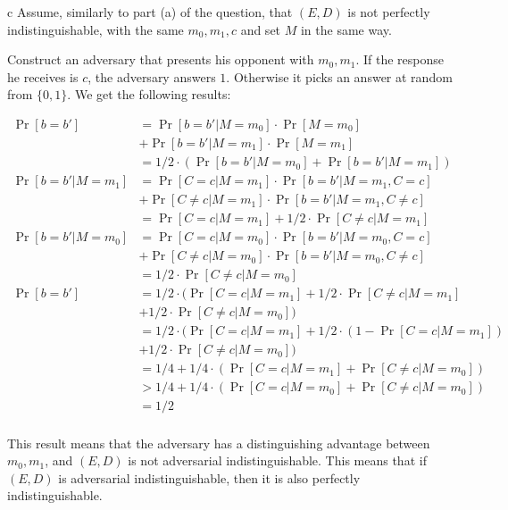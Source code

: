 \documentclass{article}
\begin{document}
\begin{paragraph}
	c Assume, similarly to part (a) of the question, that $(E,D)$ is not perfectly indistinguishable, with the same $m_0, m_1, c$ and set $M$ in the same way.

	Construct an adversary that presents his opponent with $m_0, m_1$. If the response he receives is $c$, the adversary answers $1$. Otherwise it picks an answer at random from $\{0, 1\}$. We get the following results:

	\begin{align*}
		\Pr[b = b'] &= \Pr[b = b' | M = m_0] \cdot \Pr[M = m_0]\\
		&+ \Pr[b = b' | M = m_1] \cdot \Pr[M = m_1]\\
		&= 1/2 \cdot (\Pr[b = b' | M = m_0] + \Pr[b = b' | M = m_1])\\
		\Pr[b = b'| M = m_1] &= \Pr[C = c | M = m_1] \cdot \Pr[b = b'| M = m_1, C = c]\\
		&+ \Pr[C \neq c | M = m_1] \cdot \Pr[b = b'| M = m_1, C \neq c]\\
		&= \Pr[C = c | M = m_1] + 1/2 \cdot \Pr[C \neq c | M = m_1]\\
		\Pr[b = b'| M = m_0] &= \Pr[C = c | M = m_0] \cdot \Pr[b = b'| M = m_0, C = c]\\
		&+ \Pr[C \neq c | M = m_0] \cdot \Pr[b = b'| M = m_0, C \neq c]\\
		&= 1/2 \cdot \Pr[C \neq c | M = m_0]\\
		\Pr[b = b'] &= 1/2 \cdot (\Pr[C = c | M = m_1] + 1/2 \cdot \Pr[C \neq c | M = m_1]\\
		&+ 1/2 \cdot \Pr[C \neq c | M = m_0])\\
		&= 1/2 \cdot (\Pr[C = c | M = m_1] + 1/2 \cdot (1 - \Pr[C = c | M = m_1])\\
		&+ 1/2 \cdot \Pr[C \neq c | M = m_0])\\
		&= 1/4 + 1/4 \cdot (\Pr[C = c | M = m_1] + \Pr[C \neq c | M = m_0])\\
		&> 1/4 + 1/4 \cdot (\Pr[C = c | M = m_0] + \Pr[C \neq c | M = m_0])\\
		&= 1/2\\
	\end{align*}

	This result means that the adversary has a distinguishing advantage between $m_0, m_1$, and $(E, D)$ is not adversarial indistinguishable. This means that if $(E, D)$ is adversarial indistinguishable, then it is also perfectly indistinguishable.
\end{paragraph}
\end{document}
